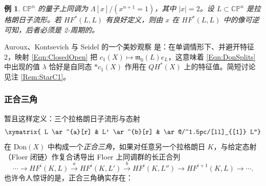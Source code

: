 \documentclass[11pt,a4paper]{article}
\numberwithin{equation}{section}
\newtheorem{Example}[thm]{例}
\newcommand{\bC}{\mathbb{C}}
\newcommand{\bP}{\mathbb{P}}
\providecommand{\frak}[1]{\mathfrak{#1}}
\begin{document}
\begin{Example}
$\bC\bP^n$ 的量子上同调为 $\Lambda[x]/(x^{n+1}=1)$，其中 $|x|=2$。设 $L\subset \bC\bP^n$ 是拉格朗日子流形。若 $HF^*(L,L)$ 有良好定义，则由 $x$ 在 $HF^*(L,L)$ 中的像可逆可知，后者必须是 2-周期的。
\end{Example}

Auroux、Kontsevich 与 Seidel 的一个美妙观察 \cite{Auroux} 是：在单调情形下、并避开特征 2，映射 \eqref{Eqn:ClosedOpen} 把 $c_1(X) \mapsto \frak{m}_0(L) e_L$，这意味着 \eqref{Eqn:DonSplits} 中出现的值 $\lambda$ 恰好是自同态 $\ast c_1(X)$ 作用在 $QH^*(X)$ 上的特征值。简短讨论见注 \ref{Rem:StarC1}。

\subsubsection{正合三角\label{Subsec:ExactTriDon}}

暂且这样定义：三个拉格朗日子流形与态射
\[
\xymatrix{ L \ar^{a}[r] & L' \ar^{b}[r] & \ar@/^1.5pc/[ll]_{[1]} L''}
\]
在 Don$(X)$ 中构成一个\emph{正合三角}，如果对任意另一个拉格朗日 $K$，与给定态射（Floer 闭链）作复合诱导出 Floer 上同调群的长正合列
\[
\cdots  \rightarrow HF^i(K,L) \stackrel{a}{\longrightarrow} HF^i(K,L')\stackrel{b}{\longrightarrow} HF^i(K,L'') \rightarrow HF^{i+1}(K,L) \rightarrow \cdots.
\]
也许令人惊讶的是，正合三角确实存在：
\end{document}
